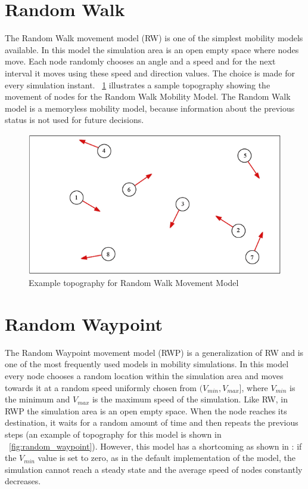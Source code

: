 \section{Random Walk}
The Random Walk movement model (RW) is one of the simplest mobility models available. In this model the simulation area is an open empty space where nodes move. Each node randomly chooses an angle and a speed and for the next interval it moves using these speed and direction values. The choice is made for every simulation instant. \figurename~\ref{fig:random_walk} illustrates a sample topography showing the movement of nodes for the Random Walk Mobility Model. The Random Walk model is a memoryless mobility model, because information about the previous status is not used for future decisions. 
\begin{figure}[htpb]
  \begin{center}
    \includegraphics[scale=0.6]{4-movimento/img/random_walk.png}
    \caption{Example topography for Random Walk Movement Model}    
    \label{fig:random_walk}
  \end{center}
\end{figure}

\section{Random Waypoint}
The Random Waypoint movement model (RWP) is a generalization of RW and is one of the most frequently used models in mobility simulations. In this model every node chooses a random location within the simulation area and moves towards it at a random speed uniformly chosen from $(V_{min}, V_{max}]$, where $V_{min}$ is the minimum and $V_{max}$ is the maximum speed of the simulation. Like RW, in RWP the simulation area is an open empty space. When the node reaches its destination, it waits for a random amount of time and then repeats the previous steps (an example of topography for this model is shown in \figurename~\ref{fig:random_waypoint}). However, this model has a shortcoming as shown in
\cite{rwpharmful}: if the $V_{min}$ value is set to zero, as in the default implementation of the model, the simulation cannot reach a steady state and the average speed of nodes constantly decreases.

